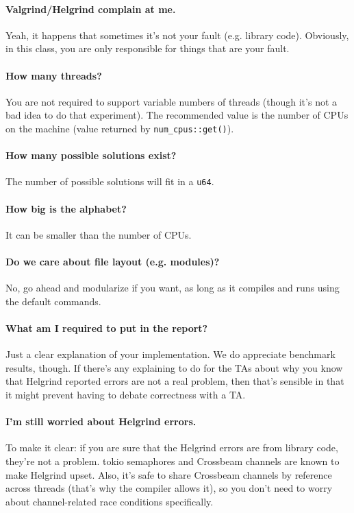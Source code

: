 \documentclass[12pt]{article}
\renewcommand{\_}{\kern-1.5pt\textunderscore\kern-1.5pt}
\begin{document}
\paragraph{Valgrind/Helgrind complain at me.} Yeah, it happens that sometimes it's not your fault (e.g. library code). Obviously, in this class, you are only responsible for things that are your fault.

\paragraph{How many threads?} You are not required to support variable numbers of threads (though it's not a bad idea to do that experiment). The recommended value is the number of CPUs on the machine (value returned by \verb+num_cpus::get()+).

\paragraph{How many possible solutions exist?} The number of possible solutions will fit in a \texttt{u64}.

\paragraph{How big is the alphabet?} It can be smaller than the number of CPUs.

\paragraph{Do we care about file layout (e.g. modules)?} No, go ahead and modularize if you want, as long as it compiles and runs using the default commands.

\paragraph{What am I required to put in the report?} Just a clear explanation of your implementation. We do appreciate benchmark results, though. If there’s any explaining to do for the TAs about why you know that Helgrind reported errors are not a real problem, then that’s sensible in that it might prevent having to debate correctness with a TA.

\paragraph{I'm still worried about Helgrind errors.} To make it clear: if you are sure that the Helgrind errors are from library code, they're not a problem. tokio semaphores and Crossbeam channels are known to make Helgrind upset. Also, it's safe to share Crossbeam channels by reference across threads (that's why the compiler allows it), so you don't need to worry about channel-related race conditions specifically.

\vspace{\baselineskip}


\end{document}
